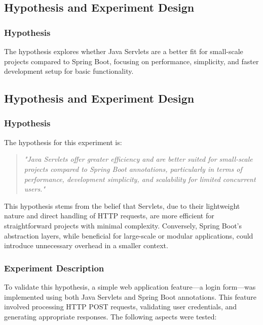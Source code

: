 \subsection{Hypothesis and Experiment Design}

\subsubsection{Hypothesis}
The hypothesis explores whether Java Servlets are a better fit for small-scale projects compared to Spring Boot, focusing on performance, simplicity, and faster development setup for basic functionality.

\subsection{Hypothesis and Experiment Design}

\subsubsection{Hypothesis}

The hypothesis for this experiment is:

\begin{quote}
    \textit{"Java Servlets offer greater efficiency and are better suited for small-scale projects compared to Spring Boot annotations, particularly in terms of performance, development simplicity, and scalability for limited concurrent users."}
\end{quote}

This hypothesis stems from the belief that Servlets, due to their lightweight nature and direct handling of HTTP requests, are more efficient for straightforward projects with minimal complexity. Conversely, Spring Boot's abstraction layers, while beneficial for large-scale or modular applications, could introduce unnecessary overhead in a smaller context.

\subsubsection{Experiment Description}

To validate this hypothesis, a simple web application feature---a login form---was implemented using both Java Servlets and Spring Boot annotations. This feature involved processing HTTP POST requests, validating user credentials, and generating appropriate responses. The following aspects were tested:

